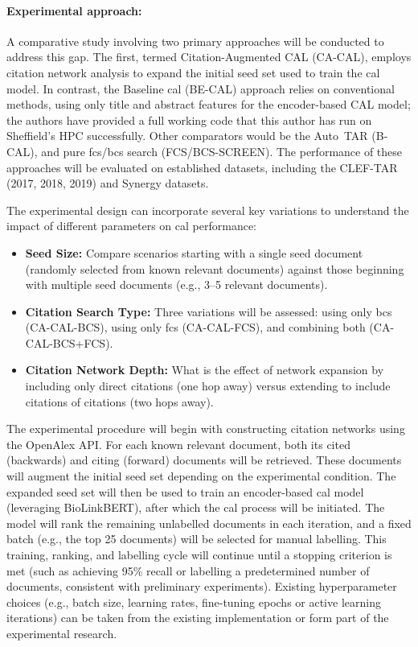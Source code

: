 \documentclass[10pt,oneside]{book}
\begin{document}
\paragraph{Experimental approach: } A comparative study involving two primary approaches will be conducted to address this gap. The first, termed Citation-Augmented CAL (CA-CAL), employs citation network analysis to expand the initial seed set used to train the \gls*{cal} model. In contrast, the Baseline \gls*{cal} (BE-CAL) approach relies on conventional methods, using only title and abstract features for the encoder-based CAL model; the authors have provided a full working code that this author has run on Sheffield's HPC successfully. Other comparators would be the Auto~TAR (B-CAL), and pure \gls*{fcs}/\gls*{bcs} search (FCS/BCS-SCREEN). The performance of these approaches will be evaluated on established datasets, including the CLEF-TAR (2017, 2018, 2019) and Synergy datasets.

The experimental design can incorporate several key variations to understand the impact of different parameters on \gls*{cal} performance:

\begin{itemize}
    \item \textbf{Seed Size:} Compare scenarios starting with a single seed document (randomly selected from known relevant documents) against those beginning with multiple seed documents (e.g., 3–5 relevant documents).
    \item \textbf{Citation Search Type:} Three variations will be assessed: using only \gls*{bcs} (CA-CAL-BCS), using only \gls*{fcs} (CA-CAL-FCS), and combining both (CA-CAL-BCS+FCS).
    \item \textbf{Citation Network Depth:} What is the effect of network expansion by including only direct citations (one hop away) versus extending to include citations of citations (two hops away).
\end{itemize}

The experimental procedure will begin with constructing citation networks using the OpenAlex API. For each known relevant document, both its cited (backwards) and citing (forward) documents will be retrieved. These documents will augment the initial seed set depending on the experimental condition. The expanded seed set will then be used to train an encoder-based \gls*{cal} model (leveraging BioLinkBERT), after which the \gls*{cal} process will be initiated. The model will rank the remaining unlabelled documents in each iteration, and a fixed batch (e.g., the top 25 documents) will be selected for manual labelling. This training, ranking, and labelling cycle will continue until a stopping criterion is met (such as achieving 95\% recall or labelling a predetermined number of documents, consistent with preliminary experiments). Existing hyperparameter choices (e.g., batch size, learning rates, fine-tuning epochs or active learning iterations) can be taken from the existing implementation or form part of the experimental research.
\end{document}
